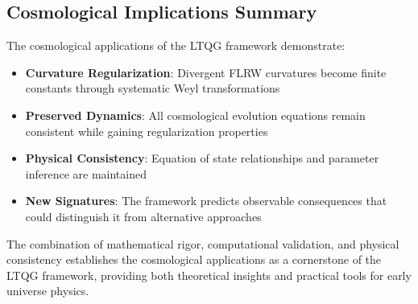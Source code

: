 \subsection{Cosmological Implications Summary}

The cosmological applications of the LTQG framework demonstrate:

\begin{itemize}
\item \textbf{Curvature Regularization}: Divergent FLRW curvatures become finite constants through systematic Weyl transformations
\item \textbf{Preserved Dynamics}: All cosmological evolution equations remain consistent while gaining regularization properties
\item \textbf{Physical Consistency}: Equation of state relationships and parameter inference are maintained
\item \textbf{New Signatures}: The framework predicts observable consequences that could distinguish it from alternative approaches
\end{itemize}

The combination of mathematical rigor, computational validation, and physical consistency establishes the cosmological applications as a cornerstone of the LTQG framework, providing both theoretical insights and practical tools for early universe physics.